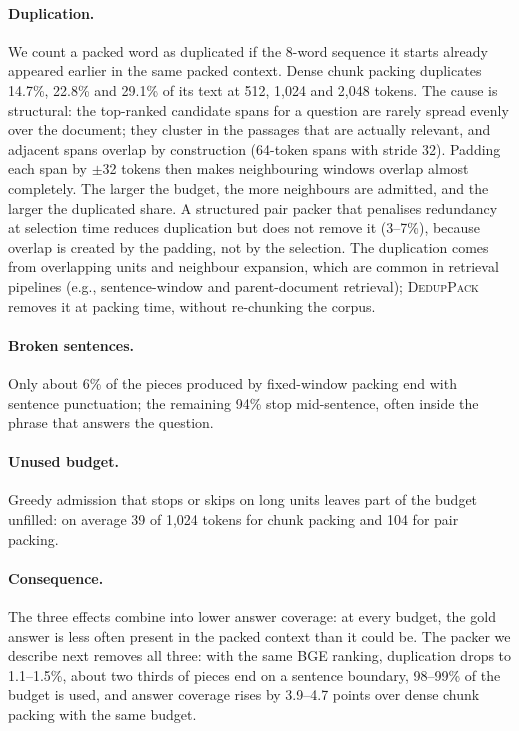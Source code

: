 \documentclass[11pt]{article}
\newcommand{\spk}{\textsc{DedupPack}}
\begin{document}
\paragraph{Duplication.} We count a packed word as duplicated if the 8-word sequence it starts already appeared earlier in the same packed context. Dense chunk packing duplicates 14.7\%, 22.8\% and 29.1\% of its text at 512, 1,024 and 2,048 tokens. The cause is structural: the top-ranked candidate spans for a question are rarely spread evenly over the document; they cluster in the passages that are actually relevant, and adjacent spans overlap by construction (64-token spans with stride 32). Padding each span by $\pm$32 tokens then makes neighbouring windows overlap almost completely. The larger the budget, the more neighbours are admitted, and the larger the duplicated share. A structured pair packer that penalises redundancy at selection time reduces duplication but does not remove it (3--7\%), because overlap is created by the padding, not by the selection. The duplication comes from overlapping units and neighbour expansion, which are common in retrieval pipelines (e.g., sentence-window and parent-document retrieval); \spk{} removes it at packing time, without re-chunking the corpus.

\paragraph{Broken sentences.} Only about 6\% of the pieces produced by fixed-window packing end with sentence punctuation; the remaining 94\% stop mid-sentence, often inside the phrase that answers the question.

\paragraph{Unused budget.} Greedy admission that stops or skips on long units leaves part of the budget unfilled: on average 39 of 1,024 tokens for chunk packing and 104 for pair packing.

\paragraph{Consequence.} The three effects combine into lower answer coverage: at every budget, the gold answer is less often present in the packed context than it could be. The packer we describe next removes all three: with the same BGE ranking, duplication drops to 1.1--1.5\%, about two thirds of pieces end on a sentence boundary, 98--99\% of the budget is used, and answer coverage rises by 3.9--4.7 points over dense chunk packing with the same budget.
\end{document}
